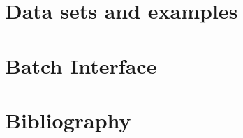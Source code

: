 \documentclass[a4paper,titlepage]{book}
\begin{document}

\part{Data sets and examples}










\part{Batch Interface}




\part{Bibliography}


\end{document}

